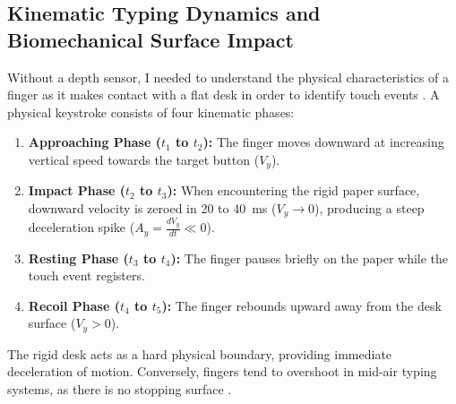 \subsection{Kinematic Typing Dynamics and Biomechanical Surface Impact}
\label{subsec:lit_typing_biomechanics}
Without a depth sensor, I needed to understand the physical characteristics of a finger as it makes contact with a flat desk in order to identify touch events \cite{Simao2016Unsupervised, MacRitchie2015Integrating, Pilkov2024Markerless}. A physical keystroke consists of four kinematic phases:
\begin{enumerate}
    \item \textbf{Approaching Phase ($t_1$ to $t_2$):} The finger moves downward at increasing vertical speed towards the target button ($V_y$).
    \item \textbf{Impact Phase ($t_2$ to $t_3$):} When encountering the rigid paper surface, downward velocity is zeroed in 20 to 40~ms ($V_y \to 0$), producing a steep deceleration spike ($A_y = \frac{dV_y}{dt} \ll 0$).
    \item \textbf{Resting Phase ($t_3$ to $t_4$):} The finger pauses briefly on the paper while the touch event registers.
    \item \textbf{Recoil Phase ($t_4$ to $t_5$):} The finger rebounds upward away from the desk surface ($V_y > 0$).
\end{enumerate}
The rigid desk acts as a hard physical boundary, providing immediate deceleration of motion. Conversely, fingers tend to overshoot in mid-air typing systems, as there is no stopping surface \cite{Boletsis2019TextInput, Maman2023TypeNet}.

